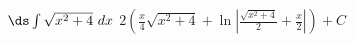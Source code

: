 {$\ds \int \sqrt{x^2+4}\ dx$
}
{$2\left(\frac x4\sqrt{x^2+4}+\ln |\frac{\sqrt{x^2+4}}2+\frac x2|\right) + C$
}